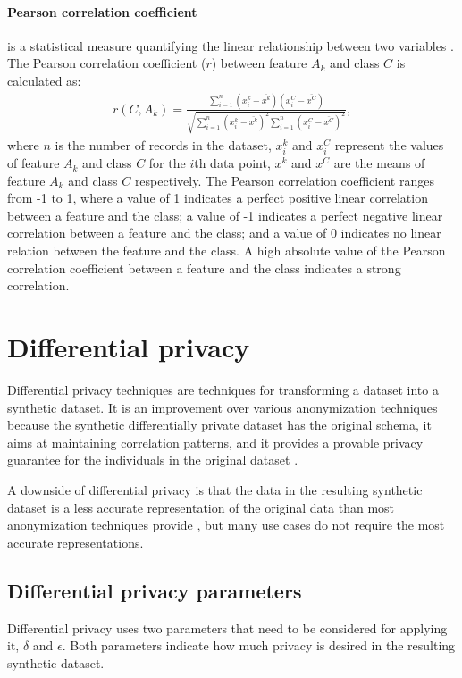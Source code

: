 \paragraph{Pearson correlation coefficient} is a statistical measure quantifying the linear relationship between two variables \cite{originalpaper}. The Pearson correlation coefficient ($r$) between feature $A_k$ and class $C$ is calculated as:
\begin{align}
r(C, A_{k}) = \frac{\sum^{n}_{i=1}(x^{k}_{i} - \overline{x^{k}}) (x^{C}_{i}-\overline{x^{C}})}{\sqrt{\sum^{n}_{i=1}(x^{k}_{i}-\overline{x^{k}})^{2} \sum^{n}_{i=1}(x^{C}_{i}-\overline{x^{C}})^2}},
\end{align}
where $n$ is the number of records in the dataset, $x^{k}_{i}$ and $x^{C}_{i}$ represent the values of feature $A_k$ and class $C$ for the $i$th data point, $\overline{x^{k}}$ and $\overline{x^{C}}$ are the means of feature $A_k$ and class $C$ respectively. The Pearson correlation coefficient ranges from -1 to 1, where a value of 1 indicates a perfect positive linear correlation between a feature and the class; a value of -1 indicates a perfect negative linear correlation between a feature and the class; and a value of 0 indicates no linear relation between the feature and the class.
A high absolute value of the Pearson correlation coefficient between a feature and the class indicates a strong correlation.

\section{Differential privacy}
Differential privacy techniques are techniques for transforming a dataset into a synthetic dataset. It is an improvement over various anonymization techniques because the synthetic differentially private dataset has the original schema, it aims at maintaining correlation patterns, and it provides a provable privacy guarantee for the individuals in the original dataset \cite{dpuitleg}.

A downside of differential privacy is that the data in the resulting synthetic dataset is a less accurate representation of the original data than most anonymization techniques provide \cite{dpuitleg}, but many use cases do not require the most accurate representations.

\subsection{Differential privacy parameters}
\label{sec:difprivparams}
Differential privacy uses two parameters that need to be considered for applying it, $\delta$ and $\epsilon$. Both parameters indicate how much privacy is desired in the resulting synthetic dataset. 

